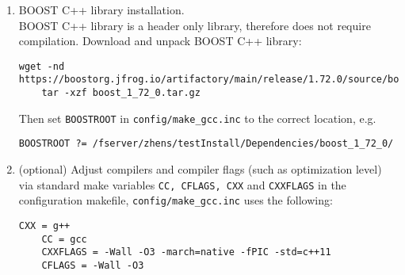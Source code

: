 \documentclass[english,11pt]{article}
\begin{document}
\begin{enumerate}
    \item BOOST C++ library installation.\\
    BOOST C++ library is a header only library, therefore does not require compilation. Download and unpack BOOST C++ library:
    \begin{lstlisting}[breaklines=true, showstringspaces=false]
    wget -nd https://boostorg.jfrog.io/artifactory/main/release/1.72.0/source/boost_1_72_0.tar.gz
    tar -xzf boost_1_72_0.tar.gz
    \end{lstlisting}
    Then set {\tt BOOSTROOT} in {\tt config/make_gcc.inc} to the correct location, e.g.
    \begin{lstlisting}[breaklines=true, showstringspaces=false]
    BOOSTROOT ?= /fserver/zhens/testInstall/Dependencies/boost_1_72_0/
    \end{lstlisting}
    
    \item (optional) Adjust compilers and compiler flags (such as optimization level) via standard make variables {\tt CC, CFLAGS, CXX} and {\tt CXXFLAGS} in the configuration makefile, {\tt config/make_gcc.inc} uses the following:
    \begin{lstlisting}[breaklines=true, showstringspaces=false]
    CXX = g++
    CC = gcc
    CXXFLAGS = -Wall -O3 -march=native -fPIC -std=c++11
    CFLAGS = -Wall -O3
    \end{lstlisting}
\end{enumerate}
\end{document}
